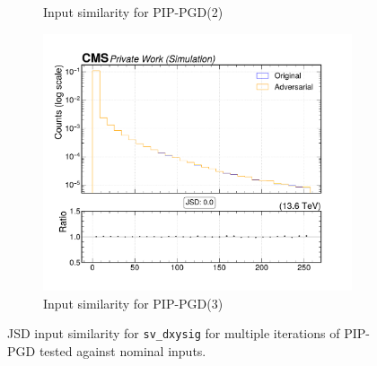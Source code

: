 \begin{figure}[htbp]
\begin{subfigure}[t]{0.32\textwidth}
    \caption*{Input similarity for PIP-PGD(2)}
  \end{subfigure}\hfill
  \begin{subfigure}[t]{0.32\textwidth}
    \includegraphics[width=\linewidth]{media/output/features/compare/combined_it_3/cmp_vtx_arr_sv_dxysig.pdf}
    \caption*{Input similarity for PIP-PGD(3)}
  \end{subfigure}

  \caption*{JSD input similarity for \texttt{sv\_dxysig} for multiple iterations of PIP-PGD tested against nominal inputs.}
  \label{fig:combined_input_sv_dxysig}
\end{figure}

